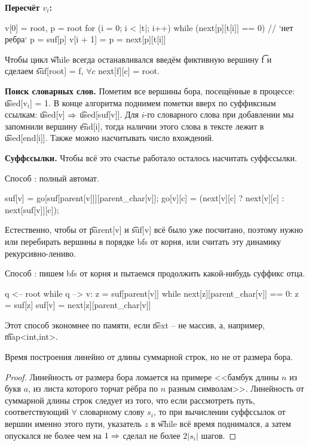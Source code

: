 {\bf Пересчёт $v_i$:}
\begin{code}
v[0] = root, p = root
for (i = 0; i < |t|; i++)
	while (next[p][t[i]] == 0) // `нет ребра`
		p = suf[p]
	v[i + 1] = p = next[p][t[i]]
\end{code}
Чтобы цикл \t{while} всегда останавливался введём фиктивную вершину \t{f} и \\
сделаем \t{suf[root] = f, $\forall c$ next[f][c] = root}.

\down
{\bf Поиск словарных слов.} Пометим все вершины бора, посещённые в процессе: \t{used[v$_i$] = 1}. 
В конце алгоритма поднимем пометки вверх по суффиксным ссылкам: \t{used[v]} $\Rightarrow$ \t{used[suf[v]]}.
Для $i$-го словарного слова при добавлении мы запомнили вершину \t{end[i]}, тогда наличии этого слова в тексте лежит в \t{used[end[i]]}.
Также можно насчитывать число вхождений.

\down
{\bf Суффссылки.} Чтобы всё это счастье работало осталось насчитать суффссылки. 

\down
Способ : полный автомат. 
\begin{code}
suf[v] = go[suf[parent[v]]][parent_char[v]];
go[v][c] = (next[v][c] ? next[v][c] : next[suf[v]][c]);
\end{code}
Естественно, чтобы от \t{parent[v]} и \t{suf[v]} всё было уже посчитано, поэтому нужно или перебирать вершины в порядке bfs от корня, или считать эту динамику рекурсивно-лениво.

\down
Способ : пишем bfs от корня и пытаемся продолжить какой-нибудь суффикс отца.
\begin{code}
q <-- root
while q --> v:
	z = suf[parent[v]]
	while next[z][parent_char[v]] == 0:
		z = suf[z]
	suf[v] = next[z][parent_char[v]]
\end{code}
Этот способ экономнее по памяти, если \t{next} -- не массив, а, например, \t{map<int,int>}.
\begin{Thm}
Время построения линейно от длины суммарной строк, но не от размера бора.
\end{Thm}
\begin{proof}
Линейность от размера бора ломается на примере <<бамбук длины $n$ из букв $a$, из листа которого торчат рёбра по $n$ разным символам>>.
Линейность от суммарной длины строк следует из того, что если рассмотреть путь, соответствующий $\forall$ словарному слову $s_i$,
то при вычислении суффссылок от вершин именно этого пути, указатель $z$ в \t{while} всё время поднимался, а затем опускался 
не более чем на $1 \Rightarrow$ сделал не более $2|s_i|$ шагов.
\end{proof}

